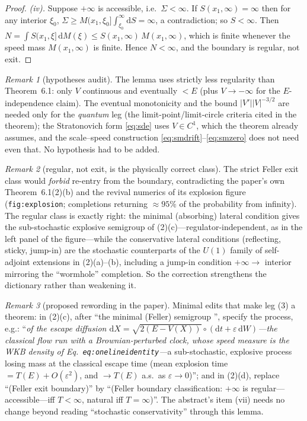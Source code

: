 \documentclass[11pt]{article}
\theoremstyle{remark}
\newtheorem{remark}{Remark}
\newcommand{\dd}{\mathrm{d}}
\begin{document}
\begin{proof}
\emph{(iv).}  Suppose $+\infty$ is accessible, i.e.\ $\Sigma<\infty$.
If $S(x_{1},\infty)=\infty$ then for any interior $\xi_{0}$,
$\Sigma\ge M(x_{1},\xi_{0}]\int_{\xi_{0}}^{\infty}\dd S=\infty$,
a contradiction; so $S<\infty$.  Then
$N=\int S(x_{1},\xi]\,\dd M(\xi)\le S(x_{1},\infty)\,M(x_{1},\infty)$,
which is finite whenever the speed mass $M(x_{1},\infty)$ is finite.
Hence $N<\infty$, and the boundary is regular, not exit.
\end{proof}

\begin{remark}[hypotheses audit]
The lemma uses strictly less regularity than Theorem~6.1: only $V$
continuous and eventually $<E$ (plus $V\to-\infty$ for the
$E$-independence claim).  The eventual monotonicity and the bound
$|V'||V|^{-3/2}$ are needed only for the \emph{quantum} leg (the
limit-point/limit-circle criteria cited in the theorem); the
Stratonovich form \eqref{eq:sde} uses $V\in C^{1}$, which the theorem
already assumes, and the scale--speed construction
\eqref{eq:smdrift}--\eqref{eq:smzero} does not need even that.  No
hypothesis had to be added.
\end{remark}

\begin{remark}[regular, not exit, is the physically correct class]
The strict Feller exit class would \emph{forbid} re-entry from the
boundary, contradicting the paper's own Theorem~6.1(2)(b) and the
revival numerics of its explosion figure (\texttt{fig:explosion};
completions returning
$\approx95\%$ of the probability from infinity).  The regular class is
exactly right: the minimal (absorbing) lateral condition gives the
sub-stochastic explosive semigroup of (2)(c)---regulator-independent,
as in the left panel of the figure---while the conservative lateral
conditions (reflecting, sticky, jump-in) are the stochastic
counterparts of the $U(1)$ family of self-adjoint extensions in
(2)(a)--(b), including a jump-in condition
$+\infty\to$ interior mirroring the ``wormhole'' completion.  So the
correction strengthens the dictionary rather than weakening it.
\end{remark}

\begin{remark}[proposed rewording in the paper]
Minimal edits that make leg (3) a theorem:
in (2)(c), after ``the minimal (Feller) semigroup \cite{Feller1952}'',
specify the process, e.g.:
``\emph{of the escape diffusion
$\dd X=\sqrt{2(E-V(X))}\circ(\dd t+\varepsilon\,\dd W)$---the classical
flow run with a Brownian-perturbed clock, whose speed measure is the
WKB density of Eq.~\emph{\texttt{eq:onelineidentity}}---}a sub-stochastic,
explosive process losing mass at the classical escape time
(mean explosion time $=T(E)+O(\varepsilon^{2})$, and $\to T(E)$ a.s.\ as
$\varepsilon\to0$)''; and in (2)(d), replace ``(Feller exit boundary)''
by ``(Feller boundary classification: $+\infty$ is
regular---accessible---iff $T<\infty$, natural iff $T=\infty$)''.
The abstract's item (vii) needs no change beyond reading
``stochastic conservativity'' through this lemma.
\end{remark}
\end{document}

